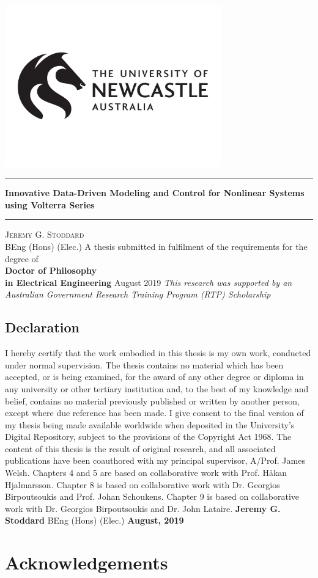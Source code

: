 \documentclass[11pt,twoside]{report}
\author{Jeremy}
\newlength{\drop}%
\newcommand*{\ulogob}{\includegraphics[width=0.7\textwidth]{UONlogo2}}
\newcommand*{\titleUL}{\begingroup
\drop=0.07\textheight
\begin{center}
{\ulogob}\\[\drop]
\rule{\textwidth}{1pt}\par
\vspace{0.5\baselineskip}
{\huge\bfseries Innovative Data-Driven Modeling and Control for Nonlinear Systems using Volterra Series}\\[0.5\baselineskip]
\rule{\textwidth}{1pt}\par
\vfill
{\Large\textsc{Jeremy G. Stoddard}} \\ BEng (Hons) (Elec.) 
\vfill
{A thesis submitted in fulfilment of the requirements for the degree of \\ {\large\bfseries Doctor of Philosophy} \\ {\small\bfseries in Electrical Engineering} }
\vfill
{\large August 2019}
\vfill
{\small \emph{This research was supported by an Australian Government Research Training Program (RTP) Scholarship}}
\end{center}
\endgroup}
\begin{document}
\thispagestyle{plain}
\titleUL
\thispagestyle{plain}
\cleardoublepage
\thispagestyle{plain}
\section*{Declaration}
\thispagestyle{plain}
\begin{minipage}{0.68\textwidth}
I hereby certify that the work embodied in this thesis is my own work, conducted under normal supervision. The thesis contains no material which has been accepted, or is being examined, for the award of any other degree or diploma in any university or other tertiary institution and, to the best of my knowledge and belief, contains no material previously published or written by another person, except where due reference has been made. I give consent to the final version of my thesis being made available worldwide when deposited in the University’s Digital Repository, subject to the provisions of the Copyright Act 1968.
\newline
\newline
The content of this thesis is the result of original research, and all associated publications have been coauthored with my principal supervisor, A/Prof. James Welsh. Chapters 4 and 5 are based on collaborative work with Prof. Håkan Hjalmarsson. Chapter 8 is based on collaborative work with Dr. Georgios Birpoutsoukis and Prof. Johan Schoukens. Chapter 9 is based on collaborative work with Dr. Georgios Birpoutsoukis and Dr. John Lataire.
\newline
\newline
\newline
\null \hrulefill \newline 
{\Large\textbf{Jeremy G. Stoddard}} \newline
BEng (Hons) (Elec.) \newline
\newline
\textbf{August, 2019}
\end{minipage}

\cleardoublepage
\thispagestyle{plain}

\chapter*{Acknowledgements}
\thispagestyle{plain}

\lipsum[1] \lipsum[2] \lipsum[3] \lipsum[4] \lipsum[5]
\end{document}
